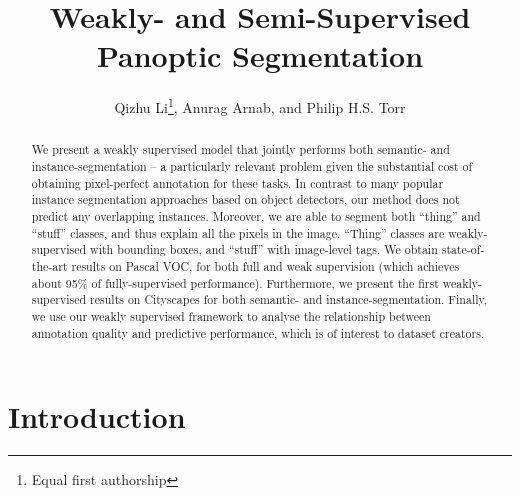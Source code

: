 \documentclass[runningheads]{llncs}
\begin{document}
\pagestyle{headings}
\mainmatter
\def\ECCV14SubNumber{95}  

\title{Weakly- and Semi-Supervised Panoptic Segmentation} 



\author{Qizhu Li\thanks{Equal first authorship}, Anurag Arnab, and Philip H.S. Torr} 


\maketitle

\begin{abstract}
We present a weakly supervised model that jointly performs both semantic- and instance-segmentation -- a particularly relevant problem given the substantial cost of obtaining pixel-perfect annotation for these tasks.
In contrast to many popular instance segmentation approaches based on object detectors, our method does not predict any overlapping instances.
Moreover, we are able to segment both ``thing'' and ``stuff'' classes, and thus explain all the pixels in the image.
``Thing'' classes are weakly-supervised with bounding boxes, and ``stuff'' with image-level tags.
We obtain state-of-the-art results on Pascal VOC, for both full and weak supervision (which achieves about 95\% of fully-supervised performance).
Furthermore, we present the first weakly-supervised results on Cityscapes for both semantic- and instance-segmentation.
Finally, we use our weakly supervised framework to analyse the relationship between annotation quality and predictive performance, which is of interest to dataset creators.

\end{abstract} 


\section{Introduction}
\end{document}
